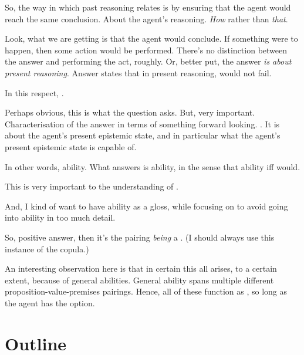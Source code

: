 \begin{note}
  So, the way in which past reasoning relates is by ensuring that the agent would reach the same conclusion.
  About the agent's reasoning.
  \emph{How} rather than \emph{that}.

  Look, what we are getting is that the agent would conclude.
  If something were to happen, then some action would be performed.
  There's no distinction between the answer and performing the act, roughly.
  Or, better put, the answer \emph{is about present reasoning}.
  Answer states that in present reasoning, would not fail.

  In this respect, \fc{}.

  Perhaps obvious, this is what the question asks.
  But, very important.
  Characterisation of the answer in terms of something forward looking.
  \fc{}.
  It is about the agent's present epistemic state, and in particular what the agent's present epistemic state is capable of.

  In other words, ability.
  What answers is ability, in the sense that ability iff would.

  This is very important to the understanding of \fc{}.

  And, I kind of want to have ability as a gloss, while focusing on \fc{} to avoid going into ability in too much detail.

  So, positive answer, then it's the pairing \emph{being} a \fc{}.
  (I should always use this instance of the copula.)
\end{note}

\begin{note}
  An interesting observation here is that in certain this all arises, to a certain extent, because of general abilities.
  General ability spans multiple different proposition-value-premises pairings.
  Hence, all of these function as , so long as the agent has the option.
\end{note}


\section{Outline}

